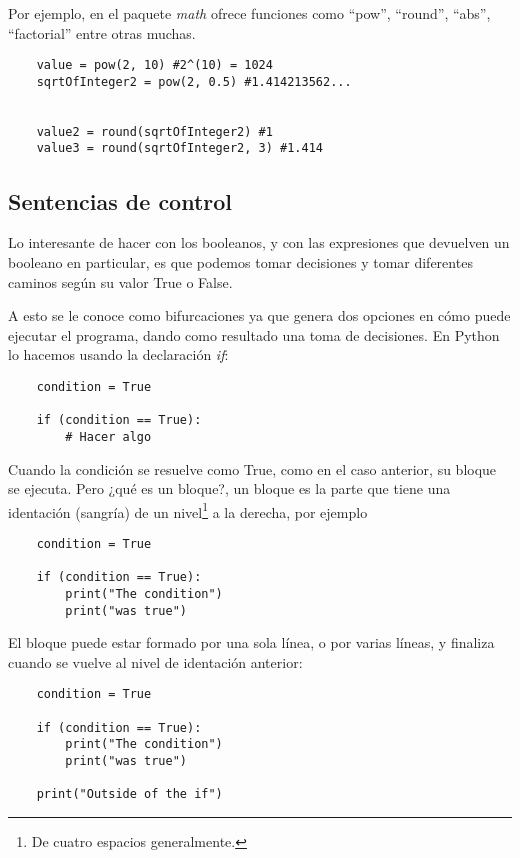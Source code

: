 \documentclass[12pt]{article}
\theoremstyle{definition}
\begin{document}
    Por ejemplo, en el paquete \textit{math} ofrece funciones como ``pow'', ``round'', ``abs'', ``factorial'' entre otras muchas.
    \begin{lstlisting}
    value = pow(2, 10) #2^(10) = 1024
    sqrtOfInteger2 = pow(2, 0.5) #1.414213562...


    value2 = round(sqrtOfInteger2) #1
    value3 = round(sqrtOfInteger2, 3) #1.414
    \end{lstlisting}



    \subsection{Sentencias de control}

    Lo interesante de hacer con los booleanos, y con las expresiones que devuelven un booleano en particular, es que
    podemos tomar decisiones y tomar diferentes caminos según su valor True o False.

    A esto se le conoce como bifurcaciones ya que genera dos opciones en cómo puede ejecutar el programa, dando como resultado
    una toma de decisiones.
    En Python lo hacemos usando la declaración \textit{if}:

    \begin{lstlisting}
    condition = True

    if (condition == True):
        # Hacer algo
    \end{lstlisting}

    Cuando la condición se resuelve como True, como en el caso anterior, su bloque se ejecuta.
    Pero ¿qué es un bloque?, un bloque es la parte que tiene una identación (sangría) de un nivel\footnote{De cuatro espacios generalmente.} a la derecha,
    por ejemplo

    \begin{lstlisting}
    condition = True

    if (condition == True):
        print("The condition")
        print("was true")
    \end{lstlisting}

    El bloque puede estar formado por una sola línea, o por varias líneas, y finaliza cuando se vuelve al nivel de identación anterior:

    \begin{lstlisting}
    condition = True

    if (condition == True):
        print("The condition")
        print("was true")

    print("Outside of the if")
    \end{lstlisting}
\end{document}
